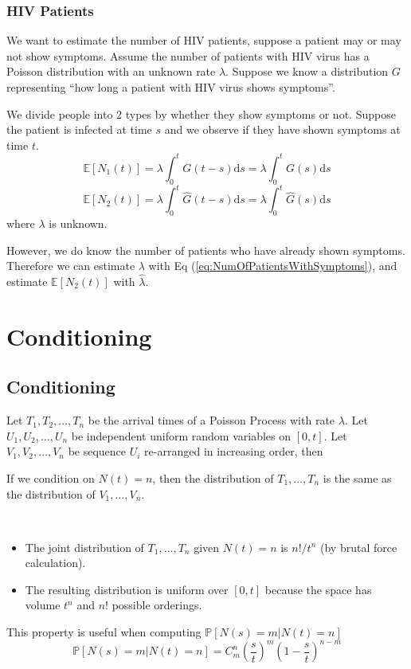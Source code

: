         \subsubsection{HIV Patients}
        We want to estimate the number of HIV patients, suppose a patient may or may not show symptoms. Assume the number of patients with HIV virus has a Poisson distribution with an unknown rate $\lambda$. Suppose we know a distribution $G$ representing ``how long a patient with HIV virus shows symptoms''.

        We divide people into 2 types by whether they show symptoms or not. Suppose the patient is infected at time $s$ and we observe if they have shown symptoms at time $t$.
        \begin{equation}\label{eq:NumOfPatientsWithSymptoms} \mathbb{E}[N_1(t)] = \lambda \int_0^t G(t-s)\mathrm{d}s = \lambda\int_0^t G(s)\mathrm{d}s \end{equation}
        \[ \mathbb{E}[N_2(t)] = \lambda \int_0^t \hat{G}(t-s)\mathrm{d}s = \lambda\int_0^t \hat{G}(s)\mathrm{d}s \]
        where $\lambda$ is unknown.

        However, we do know the number of patients who have already shown symptoms. Therefore we can estimate $\lambda$ with Eq (\ref{eq:NumOfPatientsWithSymptoms}), and estimate $\mathbb{E}[N_2(t)]$ with $\hat{\lambda}$.

\section{Conditioning}

    \subsection{Conditioning}
        Let $T_1, T_2, \dots, T_n$ be the arrival times of a Poisson Process with rate $\lambda$. Let $U_1, U_2, \dots, U_n$ be independent uniform random variables on $[0,t]$. Let $V_1, V_2, \dots, V_n$ be sequence $U_i$ re-arranged in increasing order, then
        \begin{theorem}[Conditioning]\label{thm:ConditioningOfPoissonProcess}
            If we condition on $N(t)=n$, then the distribution of $T_1, \dots, T_n$ is the same as the distribution of $V_1, \dots, V_n$.
        \end{theorem}
        \begin{sketchproof}~{}
            \begin{itemize}
                \item The joint distribution of $T_1,\dots,T_n$ given $N(t)=n$ is $n!/t^n$ (by brutal force calculation).
                \item The resulting distribution is uniform over $[0,t]$ because the space has volume $t^n$ and $n!$ possible orderings.
            \end{itemize}
        \end{sketchproof}
        \begin{remark}
            This property is useful when computing $\mathbb{P}[N(s)=m|N(t)=n]$
            \[ \mathbb{P}[N(s)=m|N(t)=n] = C^n_m \left(\frac{s}{t}\right)^m\left(1-\frac{s}{t}\right)^{n-m} \]
        \end{remark}


